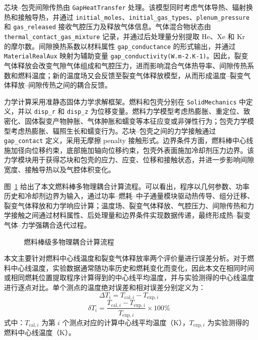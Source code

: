 芯块--包壳间隙传热由 \texttt{GapHeatTransfer} 处理。该模型同时考虑气体导热、辐射换热和接触导热，并通过 \texttt{initial\_moles}、\texttt{initial\_gas\_types}、\texttt{plenum\_pressure} 和 \texttt{gas\_released} 接收气腔压力及释放气体信息。气体混合物状态由 \texttt{thermal\_\allowbreak contact\_\allowbreak gas\_\allowbreak mixture} 记录，并通过后处理量分别提取 He、Xe 和 Kr 的摩尔数。间隙换热系数以材料属性 \texttt{gap\_\allowbreak conductance} 的形式输出，并通过 \texttt{MaterialRealAux} 映射为辅助变量 \texttt{gap\_\allowbreak conductivity(W.m-2.K-1)}。因此，裂变气体释放会改变气隙气体组成和气腔压力，进而影响混合气体热导率、间隙传热系数和燃料温度；新的温度场又会反馈至裂变气体释放模型，从而形成温度--裂变气体释放--间隙传热之间的耦合反馈。

力学计算采用准静态固体力学求解框架。燃料和包壳分别在 \texttt{SolidMechanics} 中定义，并以 \texttt{disp\_r} 和 \texttt{disp\_z} 为位移变量。燃料力学模型考虑热膨胀、重定位、致密化、固体裂变产物肿胀、气体肿胀和蠕变等本征应变或非弹性行为；包壳力学模型考虑热膨胀、辐照生长和蠕变行为。芯块--包壳之间的力学接触通过 \texttt{gap\_contact} 定义，采用无摩擦 penalty 接触形式。边界条件方面，燃料棒中心线施加径向位移约束，底部施加轴向位移约束，包壳外表面施加冷却剂压力边界。该力学模块用于获得芯块和包壳的应力、应变、位移和接触状态，并进一步影响间隙宽度、接触导热以及气腔体积变化。

图~\ref{fig:fuel_rod_multiphysics_flowchart} 给出了本文燃料棒多物理耦合计算流程。可以看出，程序以几何参数、功率历史和冷却剂边界为输入，通过功率--燃耗--中子通量模块驱动热传导、组分迁移、裂变气体释放和力学响应计算；温度场、裂变气体释放、气腔压力、间隙传热和力学接触之间通过材料属性、后处理量和边界条件实现数据传递，最终形成热--裂变气体--力学强耦合迭代过程。

\begin{figure}[!htbp]
	\centering
	
	\caption{燃料棒级多物理耦合计算流程}
	\label{fig:fuel_rod_multiphysics_flowchart}
\end{figure}

\FloatBarrier

\label{section:error_evalution_metrics}
本文主要针对燃料中心线温度和裂变气体释放率两个评价量进行误差分析。对于燃料中心线温度，实验数据通常随功率历史和燃耗变化而变化，因此本文在相同时间或相同燃耗位置提取程序计算得到的中心线平均温度，并与实验测得的中心线温度进行逐点对比。单个测点的温度绝对误差和相对误差分别定义为：
\begin{equation}
	\Delta T_i = T_{\mathrm{cal},i}-T_{\mathrm{exp},i}
\end{equation}
\begin{equation}
	\delta T_i = \frac{T_{\mathrm{cal},i}-T_{\mathrm{exp},i}}{T_{\mathrm{exp},i}}\times 100\%
\end{equation}
\noindent 式中：$T_{\mathrm{cal},i}$ 为第 $i$ 个测点对应的计算中心线平均温度（$\mathrm{K}$），$T_{\mathrm{exp},i}$ 为实验测得的燃料中心线温度（$\mathrm{K}$）。

